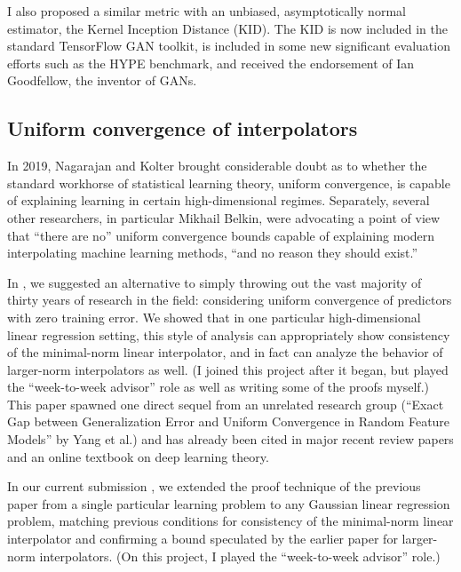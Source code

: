 \documentclass[12pt]{article}
\begin{document}
I also proposed a similar metric with an unbiased, asymptotically normal estimator, the Kernel Inception Distance (KID). The KID is now included in the standard TensorFlow GAN toolkit, is included in some new significant evaluation efforts such as the HYPE benchmark, and received the endorsement of Ian Goodfellow, the inventor of GANs.


\subsection{Uniform convergence of interpolators}
In 2019, Nagarajan and Kolter brought considerable doubt as to whether the standard workhorse of statistical learning theory, uniform convergence, is capable of explaining learning in certain high-dimensional regimes. Separately, several other researchers, in particular Mikhail Belkin, were advocating a point of view that ``there are no'' uniform convergence bounds capable of explaining modern interpolating machine learning methods, ``and no reason they should exist.''

In \cite{zhou:uniform-interpolation}, we suggested an alternative to simply throwing out the vast majority of thirty years of research in the field: considering uniform convergence of predictors with zero training error. We showed that in one particular high-dimensional linear regression setting, this style of analysis can appropriately show consistency of the minimal-norm linear interpolator, and in fact can analyze the behavior of larger-norm interpolators as well. (I joined this project after it began, but played the ``week-to-week advisor'' role as well as writing some of the proofs myself.) This paper spawned one direct sequel from an unrelated research group (``Exact Gap between Generalization Error and Uniform Convergence in Random Feature Models'' by Yang et al.) and has already been cited in major recent review papers and an online textbook on deep learning theory.

In our current submission \cite{koehler:gaussian-interpolators}, we extended the proof technique of the previous paper from a single particular learning problem to any Gaussian linear regression problem, matching previous conditions for consistency of the minimal-norm linear interpolator and confirming a bound speculated by the earlier paper for larger-norm interpolators. (On this project, I played the ``week-to-week advisor'' role.)
\end{document}
